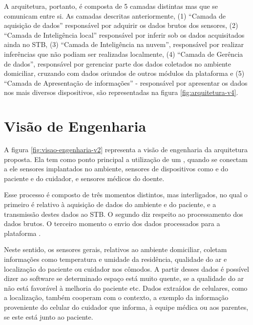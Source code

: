 
A arquitetura, portanto, é composta de 5 camadas distintas mas que se comunicam
entre si. As camadas descritas anteriormente, (1) ``Camada de aquisição de
dados'' responsável por adquirir os dados brutos dos sensores, (2) ``Camada de
Inteligência local'' responsável por inferir sob os dados acquisitados ainda no
STB, (3) ``Camada de Inteligência na nuvem'', responsável por realizar
inferências que não podiam ser realizadas localmente, (4) ``Camada de Gerência
de dados'', responsável por gerenciar parte dos dados coletados no ambiente
domiciliar, cruzando com dados oriundos de outros módulos da plataforma
\nextsaude[] e (5) ``Camada de Apresentação de informações'' - responsável por
apresentar os dados nos mais diversos dispositivos, são representadas na figura
\ref{fig:arquitetura-v4}.


\section{Visão de Engenharia} \label{sec:visao-engenharia}

A figura \ref{fig:visao-engenharia-v2} representa a visão de engenharia da arquitetura
proposta. Ela tem como ponto principal a utilização de um \stb[], quando se
conectam a ele sensores  implantados no ambiente, sensores de dispositivos como
\smartphones[] e  \smartwatches[] do paciente e do cuidador, e sensores médicos
do doente.


Esse processo é composto de três momentos distintos, mas  interligados, no qual
o primeiro é relativo à aquisição de dados do ambiente e do paciente, e a
transmissão destes dados ao STB. O segundo diz respeito ao processamento dos
dados brutos. O terceiro momento o envio dos dados processados para a plataforma
\nextsaude[].

Neste sentido, os sensores gerais, relativos ao ambiente domiciliar, coletam
informações como  temperatura e umidade da residência, qualidade do ar e
localização do paciente ou cuidador nos cômodos. A partir desses dados é
possível dizer ao software se determinado espaço está muito quente, se a
qualidade do ar não está favorável à melhoria do paciente etc. Dados extraídos
de celulares, como a localização, também cooperam com o contexto, a exemplo da
informação proveniente do celular do cuidador que informa, à equipe médica ou
aos parentes, se este está junto ao paciente.

